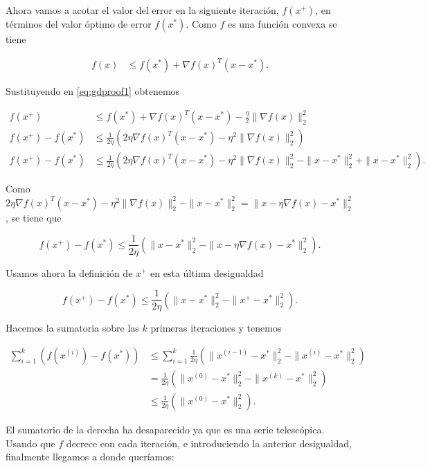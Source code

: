 Ahora vamos a acotar el valor del error en la siguiente iteración, $f(x^+)$, en términos del valor óptimo de error $f(x^*)$. Como $f$ es una función convexa se tiene

\begin{align*}
    f(x) &\leq f(x^*) + \nabla f(x)^T (x-x^*).
\end{align*}

Sustituyendo en \ref{eq:gdproof1} obtenemos

\begin{align*}
    f(x^+) &\leq f(x^*) + \nabla f(x)^T (x-x^*) - \frac{\eta}{2} \| \nabla f(x) \| ^2_2 \\ 
    f(x^+) - f(x^*) &\leq  \frac{1}{2\eta}  \left ( 2 \eta \nabla f(x)^T (x-x^*) - \eta ^2 \| \nabla f(x) \| ^2_2 \right ) \\ 
    f(x^+) - f(x^*) &\leq  \frac{1}{2\eta}  \left ( 2 \eta \nabla f(x)^T (x-x^*) - \eta ^2 \| \nabla f(x) \| ^2_2 - \| x - x^* \|^2_2 + \| x - x^* \|^2_2 \right ).    
\end{align*}

Como $  2 \eta \nabla f(x)^T (x-x^*) - \eta ^2 \| \nabla f(x) \| ^2_2 - \| x - x^* \|^2_2 = \| x - \eta \nabla f(x) - x^* \|^2_2 $, se tiene que

$$ f(x^+) - f(x^*) \leq  \frac{1}{2\eta}  \left ( \| x - x^* \|^2_2 -  \| x - \eta \nabla f(x) - x^* \|^2_2 \right ) .$$

Usamos ahora la definición de $x^+$ en esta última desigualdad

$$ f(x^+) - f(x^*) \leq  \frac{1}{2\eta}  \left ( \| x - x^* \|^2_2 -  \| x^+ - x^* \|^2_2 \right ) .$$

Hacemos la sumatoria sobre las $k$ primeras iteraciones y tenemos

\begin{align*}
    \sum^k_{i=1} \left ( f(x^{(i)}) - f(x^*) \right ) &\leq \sum^k_{i=1} \frac{1}{2\eta}  \left ( \| x^{(i-1)} - x^* \|^2_2 -  \| x^{(i)} - x^* \|^2_2 \right ) \\ 
    &=\frac{1}{2\eta}  \left ( \| x^{(0)} - x^* \|^2_2 -  \| x^{(k)} - x^* \|^2_2 \right ) \\ 
    &\leq \frac{1}{2\eta}  \left ( \| x^{(0)} - x^* \|^2_2 \right ). 
\end{align*}

El sumatorio de la derecha ha desaparecido ya que es una serie telescópica. Usando que $f$ decrece con cada iteración, e introduciendo la anterior desigualdad, finalmente llegamos a donde queríamos:

